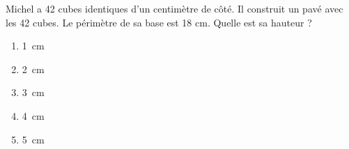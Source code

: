 Michel a 42 cubes identiques d'un centimètre de côté. Il construit un pavé avec les 42 cubes.
Le périmètre de sa base est 18 cm. Quelle est sa hauteur ?
\begin{multicols}{5}
  \begin{enumerate}[A/]
  \item 1~cm
  \item 2~cm
  \item 3~cm
  \item 4~cm
  \item 5~cm
  \end{enumerate}
\end{multicols}